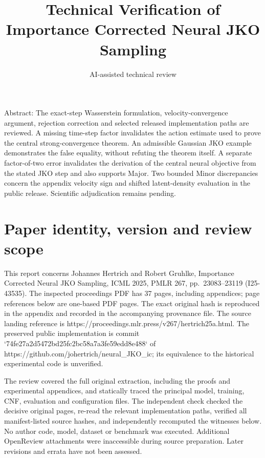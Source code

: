 \documentclass[10pt]{article}
\title{Technical Verification of Importance Corrected Neural JKO Sampling}
\author{AI-assisted technical review}
\date{}
\begin{document}
\maketitle
Abstract: The exact-step Wasserstein formulation, velocity-convergence argument, rejection correction and selected released implementation paths are reviewed. A missing time-step factor invalidates the action estimate used to prove the central strong-convergence theorem. An admissible Gaussian JKO example demonstrates the false equality, without refuting the theorem itself. A separate factor-of-two error invalidates the derivation of the central neural objective from the stated JKO step and also supports Major. Two bounded Minor discrepancies concern the appendix velocity sign and shifted latent-density evaluation in the public release. Scientific adjudication remains pending.\par
\section*{Paper identity, version and review scope}
This report concerns Johannes Hertrich and Robert Gruhlke, Importance Corrected Neural JKO Sampling, ICML 2025, PMLR 267, pp. 23083–23119 (I25-43535). The inspected proceedings PDF has 37 pages, including appendices; page references below are one-based PDF pages. The exact original hash is reproduced in the appendix and recorded in the accompanying provenance file. The source landing reference is https://proceedings.mlr.press/v267/hertrich25a.html. The preserved public implementation is commit `74fe27a2d5472bd25fc2bc58a7a3fe59edd8e488` of https://github.com/johertrich/neural\_JKO\_ic; its equivalence to the historical experimental code is unverified.\par
The review covered the full original extraction, including the proofs and experimental appendices, and statically traced the principal model, training, CNF, evaluation and configuration files. The independent check checked the decisive original pages, re-read the relevant implementation paths, verified all manifest-listed source hashes, and independently recomputed the witnesses below. No author code, model, dataset or benchmark was executed. Additional OpenReview attachments were inaccessible during source preparation. Later revisions and errata have not been assessed.\par
\end{document}
